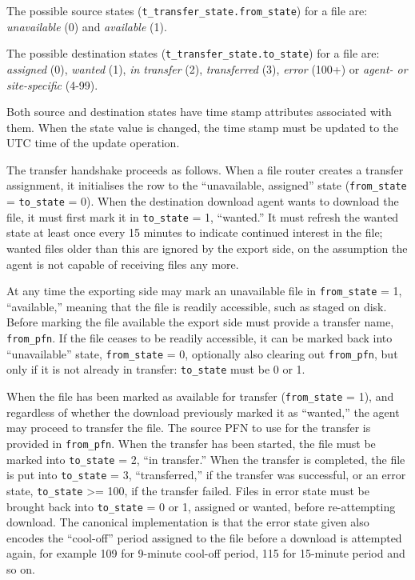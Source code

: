 \documentclass{cmspaper}
\begin{document}
The possible source states (\texttt{t\_transfer\_state.from\_state}) for a file are: {\em unavailable} (0) and {\em available} (1).

The possible destination states (\texttt{t\_transfer\_state.to\_state}) for a file are: {\em assigned} (0), {\em wanted} (1), {\em in transfer} (2), {\em transferred} (3), {\em error} (100+) or {\em agent- or site-specific} (4-99).

Both source and destination states have time stamp attributes associated with them.  When the state value is changed, the time stamp must be updated to the UTC time of the update operation.

The transfer handshake proceeds as follows.  When a file router creates a transfer assignment, it initialises the row to the ``unavailable, assigned'' state (\texttt{from\_state} = \texttt{to\_state} = 0).  When the destination download agent wants to download the file, it must first mark it in \texttt{to\_state} = 1, ``wanted.''  It must refresh the wanted state at least once every 15 minutes to indicate continued interest in the file; wanted files older than this are ignored by the export side, on the assumption the agent is not capable of receiving files any more.

At any time the exporting side may mark an unavailable file in \texttt{from\_state} = 1, ``available,'' meaning that the file is readily accessible, such as staged on disk.  Before marking the file available the export side must provide a transfer name, \texttt{from\_pfn}.  If the file ceases to be readily accessible, it can be marked back into ``unavailable'' state, \texttt{from\_state} = 0, optionally also clearing out \texttt{from\_pfn}, but only if it is not already in transfer: \texttt{to\_state} must be 0 or 1.

When the file has been marked as available for transfer (\texttt{from\_state} = 1), and regardless of whether the download previously marked it as ``wanted,'' the agent may proceed to transfer the file.  The source PFN to use for the transfer is provided in \texttt{from\_pfn}.  When the transfer has been started, the file must be marked into \texttt{to\_state} = 2, ``in transfer.''  When the transfer is completed, the file is put into \texttt{to\_state} = 3, ``transferred,'' if the transfer was successful, or an error state, \texttt{to\_state} >= 100, if the transfer failed.  Files in error state must be brought back into \texttt{to\_state} = 0 or 1, assigned or wanted, before re-attempting download.  The canonical implementation is that the error state given also encodes the ``cool-off'' period assigned to the file before a download is attempted again, for example 109 for 9-minute cool-off period, 115 for 15-minute period and so on.
\end{document}
